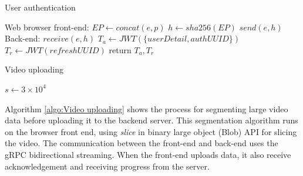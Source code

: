 \begin{minipage}{.5\textwidth}
\begin{algorithm}[H]
\caption{User authentication}
\label{algo:User authentication}
Web browser front-end:
$EP \gets concat(e, p)$
$h \gets sha256(EP)$
$send(e, h)$\;
\BlankLine
\BlankLine
\BlankLine
\BlankLine
Back-end:
$receive(e, h)$\;
$T_a \gets JWT(\{userDetail, authUUID\})$\;
$T_r \gets JWT(refreshUUID)$\;
return $T_a, T_r$\;
\end{algorithm}
\end{minipage}
\vline
\begin{minipage}{.5\textwidth}
\begin{algorithm}[H]
\caption{Video uploading}
\label{algo:Video uploading}
$s \gets 3 \times 10^{4}$ 
\end{algorithm}
\end{minipage}

Algorithm \ref{algo:Video uploading} shows the process for segmenting large video data before uploading it to the backend server.
This segmentation algorithm runs on the browser front end, using \textit{slice} in binary large object (Blob) API for slicing the video.
The communication between the front-end and back-end uses the gRPC bidirectional streaming.
When the front-end uploads data, it also receive acknowledgement and receiving progress from the server.
